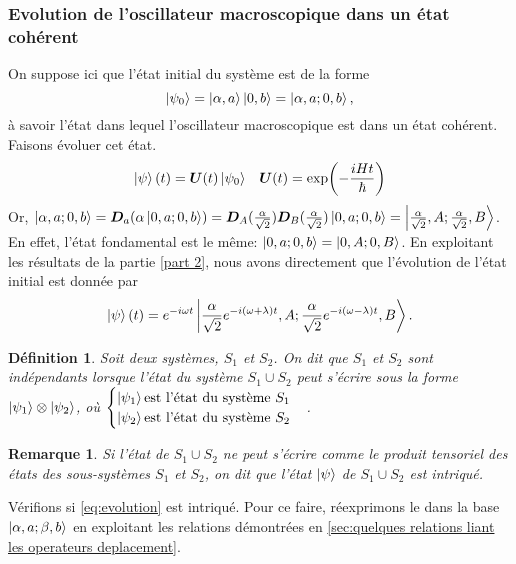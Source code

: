 \documentclass[11pt,oneside,a4paper]{article}
\newcommand{\h}{\ensuremath{\hbar}}
\newtheorem{definition}[theorem]{Définition}
\newtheorem{remark}[theorem]{Remarque}
\begin{document}
\subsubsection{Evolution de l'oscillateur macroscopique dans un état cohérent}
On suppose ici que l'état initial du système est de la forme
\begin{equation}
  \ket{\psi_0} = \ket{\alpha,a}\ket{0,b} = \ket{\alpha,a;0,b},
\end{equation}
à savoir l'état dans lequel l'oscillateur macroscopique est dans un état cohérent. Faisons évoluer cet état.
\begin{align*}
  \ket{\psi}(t) &= \bm{U}(t)\ket{\psi_0} &\bm{U}(t) = \exp(-\frac{iHt}{\h})
\end{align*}
Or, $\ket{\alpha,a;0,b} = \bm{D}_a(\alpha\ket{0,a;0,b}) = \bm{D}_A(\frac{\alpha}{\sqrt{2}})\bm{D}_B(\frac{\alpha}{\sqrt{2}})\ket{0,a;0,b} = \ket{\frac{\alpha}{\sqrt{2}},A;\frac{\alpha}{\sqrt{2}},B}$. En effet, l'état fondamental est le même: $\ket{0,a;0,b} = \ket{0,A;0,B}$. En exploitant les résultats de la partie \ref{part 2}, nous avons directement que l'évolution de l'état initial est donnée par
\begin{equation}
  \label{eq:evolution}
  \ket{\psi}(t) = e^{-i\omega t}\ket{\frac{\alpha}{\sqrt{2}}e^{-i\left(\omega+\lambda\right)t},A;\frac{\alpha}{\sqrt{2}}e^{-i\left(\omega-\lambda\right)t},B}.
\end{equation}

\begin{definition}\label{def:systemes independants}
  Soit deux systèmes, $S_1$ et $S_2$. On dit que $S_1$ et $S_2$ sont \emph{indépendants} lorsque l'état du système $S_1\cup S_2$ peut s'écrire sous la forme $\ket{\psi_1}\otimes\ket{\psi_2}$, où $\begin{cases}
    \ket{\psi_1}\text{est l'état du système } S_1\\
    \ket{\psi_2}\text{est l'état du système } S_2
  \end{cases}$.
\end{definition}

\begin{remark}
  Si l'état de $S_1\cup S_2$ ne peut s'écrire comme le produit tensoriel des états des sous-systèmes $S_1$ et $S_2$, on dit que l'état $\ket{\psi}$ de $S_1\cup S_2$ est intriqué.
\end{remark}

Vérifions si \eqref{eq:evolution} est intriqué. Pour ce faire, réexprimons le dans la base $\ket{\alpha,a;\beta,b}$ en exploitant les relations démontrées en \ref{sec:quelques relations liant les operateurs deplacement}.
\end{document}
